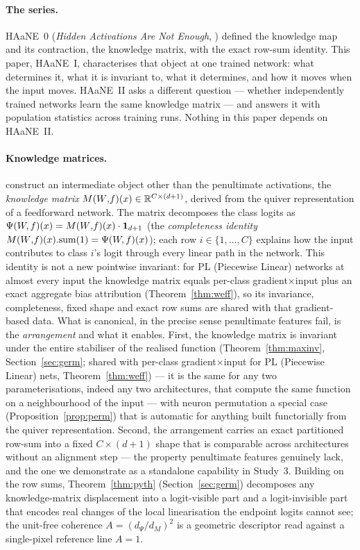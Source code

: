\paragraph{The series.}
HAaNE~0 (\emph{Hidden Activations Are Not Enough},
\citealp{leblanc2024hidden}) defined the knowledge map and its
contraction, the knowledge matrix, with the exact row-sum identity. This
paper, HAaNE~I, characterises that object at one trained network: what
determines it, what it is invariant to, what it determines, and how it
moves when the input moves. HAaNE~II asks a different question --- whether
independently trained networks learn the same knowledge matrix --- and
answers it with population statistics across training runs. Nothing in
this paper depends on HAaNE~II.

\paragraph{Knowledge matrices.}
\citet{armenta2021representation} construct an intermediate object other
than the penultimate activations, the \emph{knowledge matrix}
$M(W{,}f)(x) \in \mathbb{R}^{C \times (d{+}1)}$, derived from the quiver
representation of a feedforward network. The matrix decomposes the
class logits as $\Psi(W\!,f)(x) = M(W{,}f)(x) \cdot \mathbf{1}_{d+1}$ (the
\emph{completeness identity} $M(W{,}f)(x).\mathrm{sum}(1) = \Psi(W\!,f)(x)$); each
row $i \in \{1, \ldots, C\}$ explains how the input contributes to
class $i$'s logit through every linear path in the network. This
identity is not a new pointwise invariant: for PL (Piecewise Linear) networks at almost
every input the knowledge matrix equals per-class
gradient$\times$input plus an exact aggregate bias attribution
(Theorem~\ref{thm:weff}), so its invariance, completeness, fixed shape
and exact row sums are shared with that gradient-based data. What is
canonical, in the precise sense penultimate features fail, is the
\emph{arrangement} and what it enables. First, the knowledge matrix is
invariant under the entire stabiliser of the realised function
(Theorem~\ref{thm:maxinv}, Section~\ref{sec:germ}; shared with
per-class gradient$\times$input for PL (Piecewise Linear) nets, Theorem~\ref{thm:weff}) ---
it is the same for any two parameterisations, indeed any two
architectures, that compute the same function on a neighbourhood of the
input --- with neuron permutation a special case
(Proposition~\ref{prop:perm}) that is automatic for anything built
functorially from the quiver representation. Second, the arrangement
carries an exact partitioned row-sum into a fixed $C\times(d{+}1)$ shape
that is comparable across architectures without an alignment step ---
the property penultimate features genuinely lack, and the one we
demonstrate as a standalone capability in Study~3. Building on the row
sums, Theorem~\ref{thm:pyth} (Section~\ref{sec:germ}) decomposes any
knowledge-matrix displacement into a logit-visible part and a
logit-invisible part that encodes real changes of the local
linearisation the endpoint logits cannot see; the unit-free coherence
$A=(d_\Psi/d_M)^2$ is a geometric descriptor read against a single-pixel
reference line $A{=}1$.

